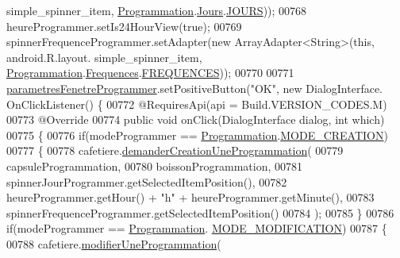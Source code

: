 \begin{DoxyCode}
      simple\_spinner\_item, \hyperlink{classcom_1_1example_1_1ekawa_1_1_programmation}{Programmation}.\hyperlink{classcom_1_1example_1_1ekawa_1_1_programmation_1_1_jours}{Jours}.\hyperlink{classcom_1_1example_1_1ekawa_1_1_programmation_1_1_jours_a45d873d90f82a1cdeabeba21a37b7aba}{JOURS}));
00768         heureProgrammer.setIs24HourView(\textcolor{keyword}{true});
00769         spinnerFrequenceProgrammer.setAdapter(\textcolor{keyword}{new} ArrayAdapter<String>(\textcolor{keyword}{this}, android.R.layout.
      simple\_spinner\_item, \hyperlink{classcom_1_1example_1_1ekawa_1_1_programmation}{Programmation}.\hyperlink{classcom_1_1example_1_1ekawa_1_1_programmation_1_1_frequences}{Frequences}.\hyperlink{classcom_1_1example_1_1ekawa_1_1_programmation_1_1_frequences_afdc0109428ca2cc827cff55b8427cd50}{FREQUENCES}));
00770 
00771         \hyperlink{classcom_1_1example_1_1ekawa_1_1_ihm_a6eb2afb2fe8da7f3a749089c84934145}{parametresFenetreProgrammer}.setPositiveButton(\textcolor{stringliteral}{"OK"}, \textcolor{keyword}{new} DialogInterface.
      OnClickListener() \{
00772             @RequiresApi(api = Build.VERSION\_CODES.M)
00773             @Override
00774             \textcolor{keyword}{public} \textcolor{keywordtype}{void} onClick(DialogInterface dialog, \textcolor{keywordtype}{int} which)
00775             \{
00776                 \textcolor{keywordflow}{if}(modeProgrammer == \hyperlink{classcom_1_1example_1_1ekawa_1_1_programmation}{Programmation}.\hyperlink{classcom_1_1example_1_1ekawa_1_1_programmation_a79242eac5d971bdb23eaf4ab930f774d}{MODE\_CREATION})
00777                 \{
00778                     cafetiere.\hyperlink{classcom_1_1example_1_1ekawa_1_1_cafetiere_a2657310905f93ef4fba5b5f1dad81be9}{demanderCreationUneProgrammation}(
00779                         capsuleProgrammation,
00780                         boissonProgrammation,
00781                         spinnerJourProgrammer.getSelectedItemPosition(),
00782                         heureProgrammer.getHour() + \textcolor{stringliteral}{"h"} + heureProgrammer.getMinute(),
00783                         spinnerFrequenceProgrammer.getSelectedItemPosition()
00784                     );
00785                 \}
00786                 \textcolor{keywordflow}{if}(modeProgrammer == \hyperlink{classcom_1_1example_1_1ekawa_1_1_programmation}{Programmation}.
      \hyperlink{classcom_1_1example_1_1ekawa_1_1_programmation_a33fb0a465e66ba5854a07e3050c12c04}{MODE\_MODIFICATION})
00787                 \{
00788                     cafetiere.\hyperlink{classcom_1_1example_1_1ekawa_1_1_cafetiere_ae15274dce04b0f875727b29e573fc83f}{modifierUneProgrammation}(

\end{DoxyCode}
